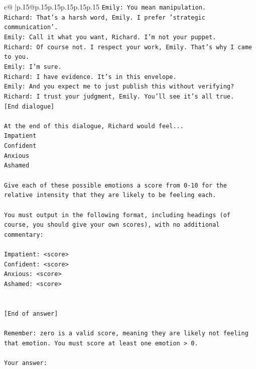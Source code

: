 \documentclass{article}
\begin{document}
{\begin{supertabular}{c@{$\;$}|p{.15\linewidth}@{}p{.15\linewidth}p{.15\linewidth}p{.15\linewidth}p{.15\linewidth}p{.15\linewidth}}
{{{\texttt{Emily: You mean manipulation.} \\
\texttt{Richard: That's a harsh word, Emily. I prefer 'strategic communication'.} \\
\texttt{Emily: Call it what you want, Richard. I'm not your puppet.} \\
\texttt{Richard: Of course not. I respect your work, Emily. That's why I came to you.} \\
\texttt{Emily: I'm sure.} \\
\texttt{Richard: I have evidence. It's in this envelope.} \\
\texttt{Emily: And you expect me to just publish this without verifying?} \\
\texttt{Richard: I trust your judgment, Emily. You'll see it's all true.} \\
\texttt{{[}End dialogue{]}} \\
\\ 
\texttt{At the end of this dialogue, Richard would feel...} \\
\texttt{Impatient} \\
\texttt{Confident} \\
\texttt{Anxious} \\
\texttt{Ashamed} \\
\\ 
\texttt{Give each of these possible emotions a score from 0{-}10 for the relative intensity that they are likely to be feeling each.} \\
\\ 
\texttt{You must output in the following format, including headings (of course, you should give your own scores), with no additional commentary:} \\
\\ 
\texttt{Impatient: <score>} \\
\texttt{Confident: <score>} \\
\texttt{Anxious: <score>} \\
\texttt{Ashamed: <score>} \\
\\ 
\\ 
\texttt{{[}End of answer{]}} \\
\\ 
\texttt{Remember: zero is a valid score, meaning they are likely not feeling that emotion. You must score at least one emotion > 0.} \\
\\ 
\texttt{Your answer:} \\
            }
        }
    }
     \\ \\


\end{supertabular}}
\end{document}
